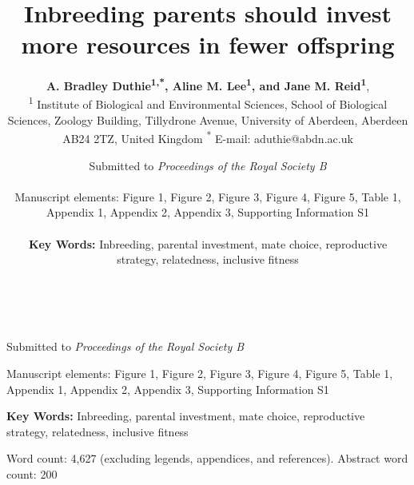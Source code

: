 \documentclass[12pt]{article}
\title{Inbreeding parents should invest more resources in fewer offspring}
\author{{\bf A. Bradley Duthie\textsuperscript{1,*}, Aline M. Lee\textsuperscript{1}, and Jane M. Reid\textsuperscript{1}}, \\ {\footnotesize \textsuperscript{1} Institute of Biological and Environmental Sciences, School of Biological Sciences, Zoology Building, Tillydrone Avenue, University of Aberdeen, Aberdeen AB24 2TZ, United Kingdom \textsuperscript{*} E-mail: aduthie@abdn.ac.uk}}
\author{Submitted to \emph{Proceedings of the Royal Society B} \\ \\ Manuscript elements: Figure 1, Figure 2, Figure 3, Figure 4, Figure 5, Table 1, Appendix 1, Appendix 2, Appendix 3, Supporting Information S1\\ \\ \textbf{Key Words:} Inbreeding, parental investment, mate choice, reproductive strategy, relatedness, inclusive fitness}
\author{}
\date{}
\begin{document}
\maketitle

\begin{center}
\vspace{5 mm}

 \\ 

\vspace{5 mm}


\vspace{15 mm}

\noindent Submitted to \emph{Proceedings of the Royal Society B}  \\ 

\vspace{15 mm} 

\noindent Manuscript elements: Figure 1, Figure 2, Figure 3, Figure 4, Figure 5, Table 1, Appendix 1, Appendix 2, Appendix 3, Supporting Information S1 \\ 

\vspace{15 mm}

\noindent \textbf{Key Words:} Inbreeding, parental investment, mate choice, reproductive strategy, relatedness, inclusive fitness
\newline

\vspace{15 mm}
\noindent Word count: 4,627 (excluding legends, appendices, and references). Abstract word count: 200

\end{center}

\linenumbers
\modulolinenumbers[2]
\doublespacing

\clearpage

\end{document}
